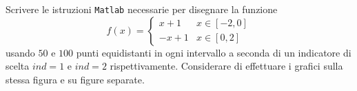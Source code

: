 Scrivere le istruzioni {\tt Matlab} necessarie per disegnare la funzione
\[
f(x)= \left\{ \begin{array}{ll} x+1 & x \in [-2, 0] \\ -x+1 & x \in [0, 2] \end{array} \right.
\]
usando $50$ e $100$ punti equidistanti in ogni intervallo a seconda di un indicatore di scelta $ind=1$ e $ind=2$ rispettivamente. Considerare di effettuare i grafici sulla stessa figura e su figure separate.

